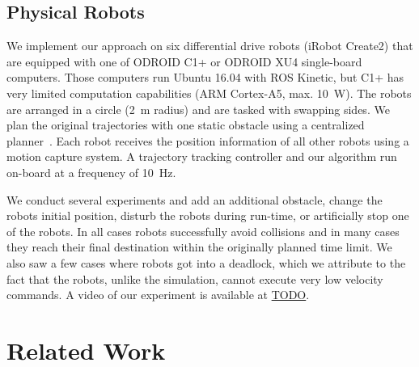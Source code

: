\documentclass{svproc}
\newcommand{\todo}[1]{\textbf{\textcolor{red}{TODO: #1}}}
\begin{document}
\subsection{Physical Robots}
We implement our approach on six differential drive robots (iRobot Create2) that are equipped with one of ODROID C1+ or ODROID XU4 single-board computers.
Those computers run Ubuntu 16.04 with ROS Kinetic, but C1+ has very limited computation capabilities (ARM Cortex-A5, max. \SI{10}{W}).
The robots are arranged in a circle (\SI{2}{m} radius) and are tasked with swapping sides.
We plan the original trajectories with one static obstacle using a centralized planner~\cite{crazyplanning-heterogeneous}.
Each robot receives the position information of all other robots using a motion capture system.
A trajectory tracking controller and our algorithm run on-board at a frequency of \SI{10}{Hz}.

We conduct several experiments and add an additional obstacle, change the robots initial position, disturb the robots during run-time, or artificially stop one of the robots.
In all cases robots successfully avoid collisions and in many cases they reach their final destination within the originally planned time limit.
We also saw a few cases where robots got into a deadlock, which we attribute to the fact that the robots, unlike the simulation, cannot execute very low velocity commands.
A video of our experiment is available at \url{TODO}.



\section{Related Work}
\label{sec:relatedWork}
\end{document}
